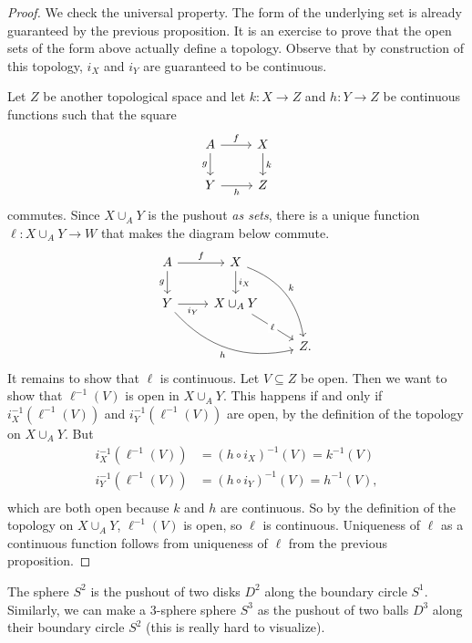 \documentclass[noname]{notes}
\begin{document}
\begin{proof}
	We check the universal property. The form of the underlying set is already guaranteed by the previous proposition. It is an exercise to prove that the open sets of the form above actually define a topology. Observe that by construction of this topology, $i_X$ and $i_Y$ are guaranteed to be continuous. 
	
	Let $Z$ be another topological space and let $k \colon X \to Z$ and $h \colon Y \to Z$ be continuous functions such that the square 
	\[
		\begin{tikzcd}
			A \ar[r, "f"] \ar[d, "g"'] & X \ar[d, "k"] \\
			Y \ar[r, "h"'] & Z
		\end{tikzcd}	
	\]
	commutes. Since $X \cup_A Y$ is the pushout \emph{as sets}, there is a unique function $\ell \colon X \cup_A Y \to W$ that makes the diagram below commute. 
	\[
		\begin{tikzcd}
			A \ar[r, "f"] \ar[d, "g"'] & X \ar[d, "i_X"] \ar[ddr, "k", bend left=30]\\
			Y \ar[r, "i_Y"']\ar[drr, "h"', bend right=30] & X \cup_A Y \ar[dr, "\ell" description] \\
			& & Z.
		\end{tikzcd}	
	\]
	It remains to show that $\ell$ is continuous. Let $V \subseteq Z$ be open. Then we want to show that $\ell^{-1}(V)$ is open in $X \cup_A Y$. This happens if and only if $i_X^{-1}(\ell^{-1}(V))$ and $i_Y^{-1}(\ell^{-1}(V))$ are open, by the definition of the topology on $X \cup_A Y$. But 
	\begin{align*}
		i_X^{-1}(\ell^{-1}(V)) &= (h \circ i_X)^{-1}(V) = k^{-1}(V) \\
		i_Y^{-1}(\ell^{-1}(V)) &= (h \circ i_Y)^{-1}(V) = h^{-1}(V), \\
	\end{align*}
	which are both open because $k$ and $h$ are continuous. So by the definition of the topology on $X \cup_A Y$, $\ell^{-1}(V)$ is open, so $\ell$ is continuous. Uniqueness of $\ell$ as a continuous function follows from uniqueness of $\ell$ from the previous proposition. 
\end{proof}

\begin{example}
	The sphere $S^2$ is the pushout of two disks $D^2$ along the boundary circle $S^1$. Similarly, we can make a $3$-sphere sphere $S^3$ as the pushout of two balls $D^3$ along their boundary circle $S^2$ (this is really hard to visualize). 
\end{example}
\end{document}
